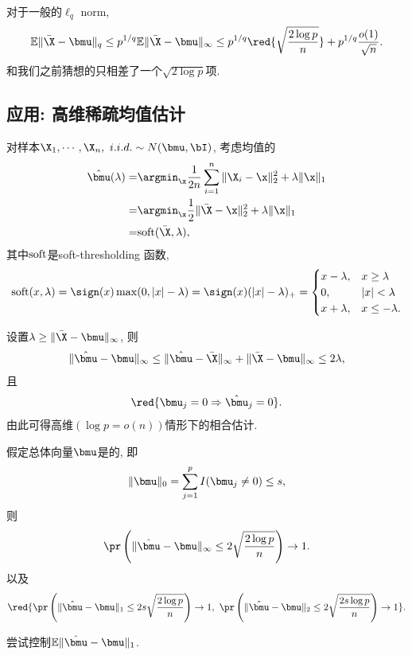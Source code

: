 对于一般的$\ell_q$ norm, 	
\begin{align*}
	\E \|\bar{\X}-\bmu\|_q \leq p^{1/q}	\E \|\bar{\X}-\bmu\|_\infty \leq p^{1/q} \red{\sqrt{\frac{2 \log p}{n}}}+p^{1/q} \frac{o(1)}{\sqrt{n}}.
\end{align*}
和我们之前猜想的只相差了一个$\sqrt{2 \log p}$项.
\subsection{应用: 高维稀疏均值估计}
对样本$\X_1,\cdots, \X_n,~i.i.d.\sim N(\bmu, \bI)$, 考虑均值的
\begin{align*}
	\hat{\bmu}(\lambda)=&\argmin_{\x} \frac{1}{2n}\sum_{i=1}^n \|\X_i-\x\|_2^2+\lambda \|\x\|_1\\
	=&\argmin_{\x} \frac{1}{2}\|\bar{\X}-\x\|_2^2+\lambda \|\x\|_1\\
	=&\soft(\bar{\X},\lambda),
\end{align*}
其中$\mbox{soft}$是soft-thresholding 函数, 
\begin{align*}
	\soft(x,\lambda)=\sign(x)\max(0,|x|-\lambda)=\sign(x)(|x|-\lambda)_{+}=\begin{cases}
		x-\lambda, & x \geq \lambda\\
		0,& |x|<\lambda\\
		x+\lambda, & x\leq -\lambda.
	\end{cases}
\end{align*}

设置$\lambda\geq \|\bar{\X}-\bmu\|_\infty$, 则
\begin{align*}
	\|\hat{\bmu}-\bmu\|_\infty \leq \|\hat{\bmu}-\bar{\X}\|_\infty  +\|\bar{\X}-\bmu\|_\infty\leq 2\lambda,
\end{align*}
且
\begin{align*}
	\red{\bmu_j=0 \Rightarrow \hat{\bmu}_j=0}.
\end{align*}
由此可得高维$(\log p =o(n))$情形下的相合估计. 
\begin{prop}[严格稀疏]
假定总体向量$\bmu$是的, 即
\begin{align*}
	\|\bmu\|_0 =\sum_{j=1}^p I(\bmu_j \neq 0) \leq s,
\end{align*}	
则
\begin{align*}
	\pr\left(\|\hat{\bmu}-\bmu\|_\infty\leq 2\sqrt{\frac{2\log p}{n}}\right) \to 1.
\end{align*}
以及
\begin{align*}
	\red{\pr\left(\|\hat{\bmu}-\bmu\|_1 \leq 2s\sqrt{\frac{2\log p}{n}}\right) \to 1,~\pr\left(\|\hat{\bmu}-\bmu\|_2 \leq 2\sqrt{\frac{2s\log p}{n}}\right) \to 1}.
\end{align*}
\end{prop}
\begin{ques}
	尝试控制$\E \|\hat{\bmu}-\bmu\|_1$.
\end{ques}

